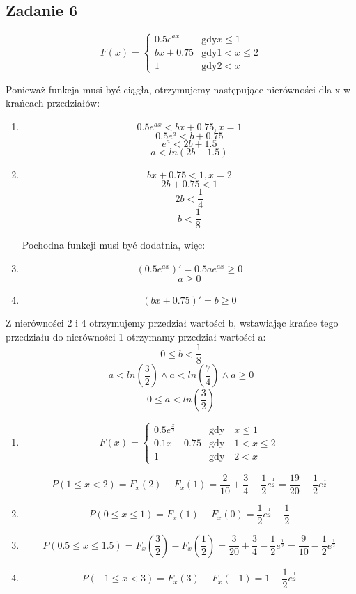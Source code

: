 \subsection{Zadanie 6}

$$
F(x) = \left\{
\begin{array}{ll}
0.5 e^{ax} & \text{gdy} x \leq 1\\
bx+0.75 & \text{gdy} 1 < x \leq 2\\
1 & \text{gdy}2 < x
\end{array}
\right.
$$

Ponieważ funkcja musi być ciągła, otrzymujemy następujące
nierówności dla x w krańcach przedziałów:

\begin{enumerate}
\item
$$0.5 e^{ax} < bx+0.75, x = 1 $$
$$0.5 e^{a} < b + 0.75$$
$$e^{a} < 2b + 1.5$$
$$a < ln(2b + 1.5)$$

\item
$$bx + 0.75 < 1, x = 2$$
$$2b + 0.75 < 1$$
$$2b < \frac{1}{4}$$
$$b < \frac{1}{8}$$

Pochodna funkcji musi być dodatnia, więc:
\item
$$(0.5 e^{ax})' = 0.5a e^{ax} \geq 0$$
$$a \geq 0$$
\item
$$(bx + 0.75)'= b \geq 0$$
\end{enumerate}

Z nierówności 2 i 4 otrzymujemy przedział wartości b, wstawiając krańce tego przedziału do nierówności 1 otrzymamy przedział wartości a:
$$0 \leq b < \frac{1}{8}$$
$$a < ln(\frac{3}{2}) \land a < ln(\frac{7}{4}) \land a \geq 0$$
$$0 \leq a < ln(\frac{3}{2})$$

\begin{enumerate}[label=(\alph*)]
\item
$$
F(x) = \left\{
\begin{array}{ll}
0.5e^{\frac{x}{2}} & \text{gdy} \quad x \leq 1\\
0.1x + 0.75 & \text{gdy} \quad 1 < x \leq 2\\
1 & \text{gdy} \quad 2 < x
\end{array}
\right.
$$

$$
P(1 \leq x < 2) = F_{x}(2) - F_{x}(1) = \frac{2}{10} + \frac{3}{4} -
\frac{1}{2}e^{\frac{1}{2}} = \frac{19}{20} - \frac{1}{2}e^{\frac{1}{2}}
$$

\item
$$
P(0 \leq x \leq 1) = F_{x}(1) - F_{x}(0) = \frac{1}{2}e^{\frac{1}{2}} -
\frac{1}{2}
$$

\item
$$
P(0.5 \leq x \leq 1.5) = F_{x}(\frac{3}{2}) - F_{x}(\frac{1}{2}) = \frac{3}{20} +
\frac{3}{4} - \frac{1}{2}e^{\frac{1}{2}}= \frac{9}{10} - \frac{1}{2}e^{\frac{1}{2}}
$$

\item
$$
P(-1 \leq x < 3) = F_{x}(3) - F_{x}(-1) = 1 - \frac{1}{2}e^{\frac{1}{2}}
$$
\end{enumerate}

